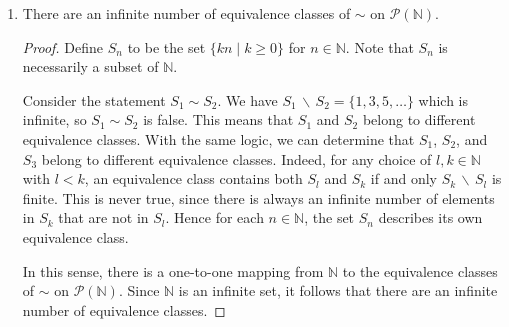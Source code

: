 \begin{enumerate}
\begin{enumerate}
                Since $\mathbb{N}$ is infinite, $(N \, \backslash \, X)$ is finite if and only if $X = (\mathbb{N} \, \backslash \, Y)$ for some finite subset $Y$ of $\mathbb{N}$.
                This means that the equivalence class of $\mathbb{N}$ is
                \[ [\mathbb{N}] = \{(\mathbb{N} \, \backslash \, Y) \; \big| \; Y \subseteq \mathbb{N} \; \text{and} \; Y \; \text{is finite}\}. \]

                \bigskip

            \item
                \begin{proposition} \label{prop:3-c}
                    There are an infinite number of equivalence classes of $\sim$ on $\mathcal{P}(\mathbb{N})$.
                \end{proposition}

                \begin{proof}
                    Define $S_n$ to be the set $\{k n \; \big| \; k \ge 0\}$ for $n \in \mathbb{N}$.
                    Note that $S_n$ is necessarily a subset of $\mathbb{N}$.

                    Consider the statement $S_1 \sim S_2$.
                    We have $S_1 \, \backslash \, S_2 = \{1, 3, 5, \ldots\}$ which is infinite, so $S_1 \sim S_2$ is false.
                    This means that $S_1$ and $S_2$ belong to different equivalence classes.
                    With the same logic, we can determine that $S_1$, $S_2$, and $S_3$ belong to different equivalence classes.
                    Indeed, for any choice of $l, k \in \mathbb{N}$ with $l < k$, an equivalence class contains both $S_l$ and $S_k$ if and only $S_k \, \backslash \, S_l$ is finite.
                    This is never true, since there is always an infinite number of elements in $S_k$ that are not in $S_l$.
                    Hence for each $n \in \mathbb{N}$, the set $S_n$ describes its own equivalence class.

                    In this sense, there is a one-to-one mapping from $\mathbb{N}$ to the equivalence classes of $\sim$ on $\mathcal{P}(\mathbb{N})$. Since $\mathbb{N}$ is an infinite set, it follows that there are an infinite number of equivalence classes.
                \end{proof}

        \end{enumerate}

\end{enumerate}


